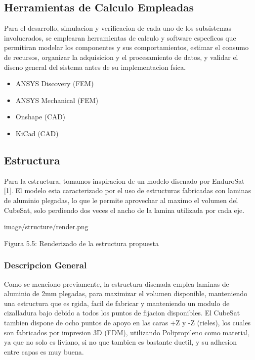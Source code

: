   \subsection{Herramientas de Calculo Empleadas}
    Para el desarrollo, simulacion y verificacion de cada uno de los subsistemas involucrados,
    se emplearan herramientas de calculo y software especficos que permitiran modelar los componentes
    y sus comportamientos, estimar el consumo de recursos, organizar la adquisicion y
    el procesamiento de datos, y validar el diseno general del sistema antes de su implementacion
    fsica.

    \begin{itemize}
      \item ANSYS Discovery (FEM)
      \item ANSYS Mechanical (FEM)
      \item Onshape (CAD)
      \item KiCad (CAD)
    \end{itemize}

  \subsection{Estructura}
    Para la estructura, tomamos inspiracion de un modelo disenado por EnduroSat [1]. El
    modelo esta caracterizado por el uso de estructuras fabricadas con laminas de aluminio
    plegadas, lo que le permite aprovechar al maximo el volumen del CubeSat, solo perdiendo
    dos veces el ancho de la lamina utilizada por cada eje.

    image/structure/render.png

    Figura 5.5: Renderizado de la estructura propuesta

    \subsubsection{Descripcion General}
      Como se menciono previamente, la estructura disenada emplea laminas de aluminio de
      2mm plegadas, para maximizar el volumen disponible, manteniendo una estructura que es
      rgida, facil de fabricar y manteniendo un modulo de cizalladura bajo debido a todos los
      puntos de fijacion disponibles. El CubeSat tambien dispone de ocho puntos de apoyo en
      las caras +Z y -Z (rieles), los cuales son fabricados por impresion 3D (FDM), utilizando
      Polipropileno como material, ya que no solo es liviano, si no que tambien es bastante ductil,
      y su adhesion entre capas es muy buena.

